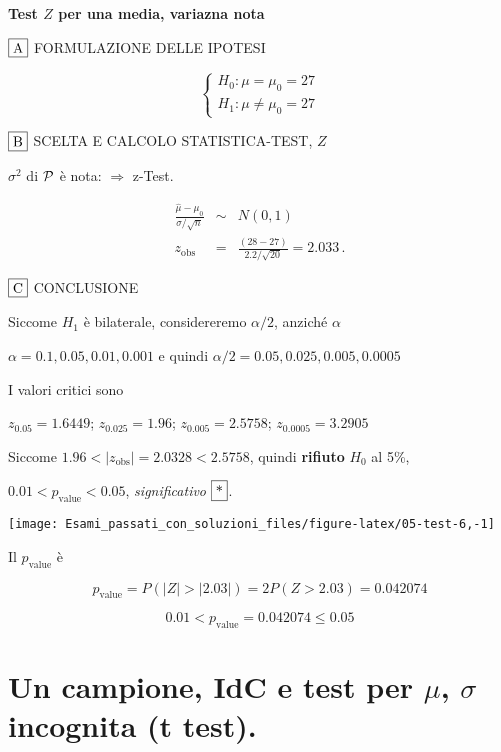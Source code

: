 \documentclass[
  11pt,
]{book}
\theoremstyle{mytheoremstyle}
\theoremstyle{mydefstyle}
\newenvironment{sol}
  {
  \begin{tcolorbox}[enhanced,breakable,arc=0.1mm,boxrule=1pt,colback=white,colframe=iblue,
  title=\bf \fontfamily{lmss}\selectfont \hspace{.5 cm} Soluzione,drop fuzzy shadow]

}{
\end{tcolorbox}
  }
\begin{document}
\begin{sol}
\textbf{Test \(Z\) per una media, variazna nota}

\(\fbox{A}\) FORMULAZIONE DELLE IPOTESI

\[\begin{cases}
   H_0: \mu = \mu_0=27 \\
   H_1: \mu \neq \mu_0=27 
   \end{cases}\]

\(\fbox{B}\) SCELTA E CALCOLO STATISTICA-TEST, \(Z\)

\(\sigma^{2}\) di \(\cal{P}\) è nota: \(\Rightarrow\) z-Test.

\begin{eqnarray*}
   \frac{\hat\mu - \mu_{0}} {\sigma/\sqrt{n}}&\sim&N(0,1)\\
   z_{\text{obs}}
   &=& \frac{ ( 28 -  27 )} { 2.2 /\sqrt{ 20 }}
   =   2.033 \, .
   \end{eqnarray*}

\(\fbox{C}\) CONCLUSIONE

Siccome \(H_1\) è bilaterale, considereremo \(\alpha/2\),
anziché \(\alpha\)

\(\alpha=0.1, 0.05, 0.01, 0.001\) e quindi \(\alpha/2=0.05, 0.025, 0.005, 0.0005\)

I valori critici sono

\(z_{0.05}=1.6449\); \(z_{0.025}=1.96\); \(z_{0.005}=2.5758\); \(z_{0.0005}=3.2905\)

Siccome \(1.96<|z_\text{obs}|=2.0328<2.5758\), quindi \textbf{rifiuto} \(H_0\) al 5\%,

\(0.01<p_\text{value}<0.05\), \emph{significativo} \(\fbox{*}\).

\begin{center}\texttt{[image: Esami\_passati\_con\_soluzioni\_files/figure-latex/05-test-6,-1]} \end{center}

Il \(p_{\text{value}}\) è

\[ p_{\text{value}} = P(|Z|>|2.03|)=2P(Z>2.03)=0.042074 \]

\[
 0.01 < p_\text{value}= 0.042074 \leq 0.05 
\]

\end{sol}

\section{\texorpdfstring{Un campione, IdC e test per \(\mu\), \(\sigma\) incognita (t test).}{Un campione, IdC e test per \textbackslash mu, \textbackslash sigma incognita (t test).}}\label{un-campione-idc-e-test-per-mu-sigma-incognita-t-test.}
\end{document}
